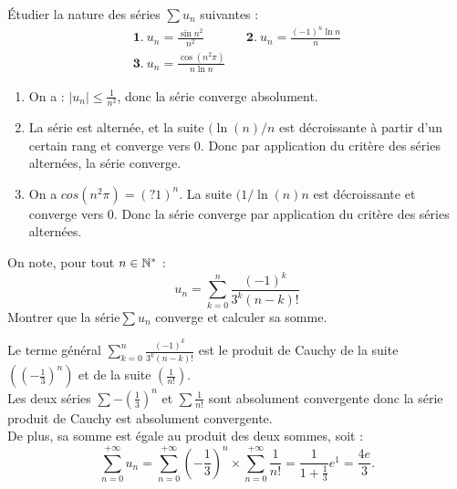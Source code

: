 \documentclass{book}
\begin{document}
\begin{Exercice}[Alternée]
\'Etudier la nature des séries $\sum u_n$ suivantes :
$$\begin{array}{lll}
\mathbf 1.\ u_n=\frac{\sin n^2}{n^2}&&\mathbf 2.\ u_n=\frac{(-1)^n\ln n}{n}\\
\mathbf 3.\  u_n=\frac{\cos (n^2\pi)}{n\ln n}
\end{array}$$
%
\begin{Correction}
\begin{enumerate}
\item On a : $|u_n|\leq \frac{1}{n^2}$, donc la série converge absolument.
\item La série est alternée, et la suite $(\ln(n)/n$ est décroissante  à partir d'un certain rang et  converge vers 0. Donc par application du critère des séries alternées, la série converge.
\item On a $cos(n^2 \pi)=(?1)^n$. La suite $(1/\ln(n)n$ est décroissante et  converge vers 0.  Donc la série converge par application du critère des séries alternées. 
\end{enumerate}
\end{Correction}
\end{Exercice}
\begin{Exercice}[Cauchy]
On note, pour tout $n \in \mathbb{N}^*$  : 
$$u_n = \sum_{k=0}^n\frac{(-1) ^k}{3^k(n-k)!}$$
Montrer que la série$\sum u_n$ converge et  calculer sa somme. 

\begin{Correction}
Le terme général $\sum_{k=0}^n\frac{(-1) ^k}{3^k(n-k)!}$  est le produit de Cauchy de la suite $\left( \left(-\frac{1}{3}\right)^n \right)$ et de la suite  $(\frac{1}{n!})$.\\
Les deux séries  $\sum -\left(\frac{1}{3}\right)^n $ et $\sum \frac{1}{n!}$ sont absolument convergente donc la série produit de Cauchy est absolument convergente.\\


De plus, sa somme est égale au produit des deux sommes, soit :
$$\sum_{n=0}^{+\infty}u_n = \sum_{n=0}^{+\infty} \left(-\frac{1}{3}\right)^n\times\sum_{n=0}^{+\infty} \frac{1}{n!}=\frac{1}{1+\frac{1}{3}}e^1=\frac{4e}{3}.$$
\end{Correction}
\end{Exercice}
\end{document}
